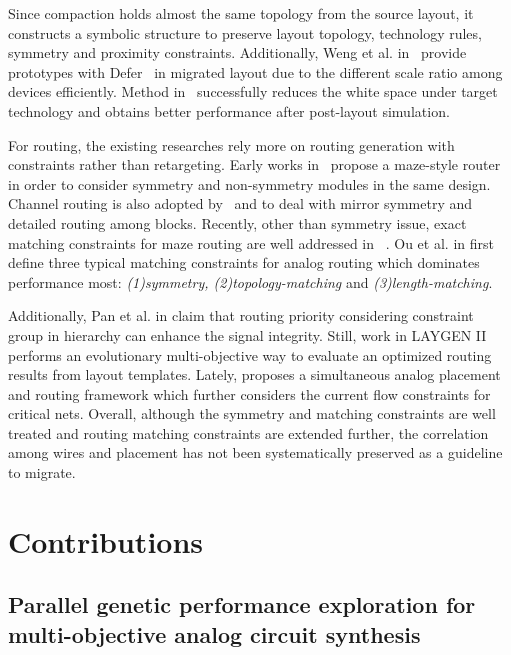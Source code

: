       Since compaction holds almost the same topology from the source layout, it constructs a symbolic structure to preserve layout topology, technology rules, symmetry and proximity constraints. Additionally, Weng et al. in~\cite{ALP_YPWeng_iccad2011} provide prototypes with Defer~\cite{defer_jackey_tcad10} in migrated layout due to the different scale ratio among devices efficiently. Method in~\cite{ALP_YPWeng_iccad2011} successfully reduces the white space under target technology and obtains better performance after post-layout simulation. 

      For routing, the existing researches rely more on routing generation with constraints rather than retargeting. Early works in~\cite{KOAN_ANAGRAMII-JSSC1991,aicon_malE_tcad96,ppraic_Linfu_iccad2010} propose a maze-style router in order to consider symmetry and non-symmetry modules in the same design. Channel routing is also adopted by~\cite{cbcrams_UChoudhury_tcad93} and \cite{aicon_malE_tcad96} to deal with mirror symmetry and detailed routing among blocks. Recently, other than symmetry issue, exact matching constraints for maze routing are well addressed in ~\cite{ermams_MMOzdal_tcad09}. Ou et al. in \cite{numarmc_HCOu_dac12} first define three typical matching constraints for analog routing which dominates performance most: {\it(1)symmetry, (2)topology-matching} and {\it (3)length-matching}. 

      Additionally, Pan et al. in \cite{Pan_CGR_ICCAD2012} claim that routing priority considering constraint group in hierarchy can enhance the signal integrity. Still, work in LAYGEN II \cite{LAYGENII_TCAD13} performs an evolutionary multi-objective way to evaluate an optimized routing results from layout templates. Lately, \cite{SAPR_DAC13} proposes a simultaneous analog placement and routing framework which further considers the current flow constraints for critical nets. Overall, although the symmetry and matching constraints are well treated and routing matching constraints are extended further, the correlation among wires and placement has not been systematically preserved as a guideline to migrate.

  \section{Contributions}\label{sec:contribution}
    \subsection{Parallel genetic performance exploration for multi-objective analog circuit synthesis}


